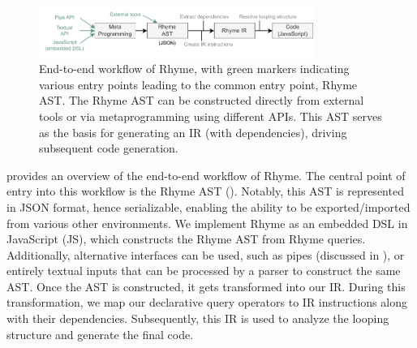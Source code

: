 \documentclass[runningheads]{llncs}
\newcommand{\lang}{Rhyme}
\begin{document}
\begin{figure}[t!]
\centering
\includegraphics[width=0.8\textwidth]{images/intro_fig.pdf}
\caption{
End-to-end workflow of \lang{}, with green markers indicating various entry points
leading to the common entry point, \lang{} AST.
The \lang{} AST can be constructed directly from external tools or via metaprogramming
using different APIs.
This AST serves as the basis for generating an IR (with dependencies), driving
subsequent code generation.
}\label{fig:intro_overview}
\vspace{-7mm}
\end{figure}

 provides an overview of the end-to-end workflow of \lang{}.
The central point of entry into this workflow is the \lang{} AST ().
Notably, this AST is represented in JSON format, hence serializable, enabling the ability
to be exported/imported from various other environments.
We implement \lang{} as an embedded DSL in JavaScript (JS), 
which constructs the \lang{} AST from \lang{} queries.
Additionally, alternative interfaces can be used, such as pipes (discussed in ),
or entirely textual inputs that can be processed by a parser to construct the same AST.
Once the AST is constructed, it gets transformed into our IR.
During this transformation, we map our declarative query operators to IR instructions
along with their dependencies.
Subsequently, this IR is used to analyze the looping structure and generate the final
code.
\end{document}
